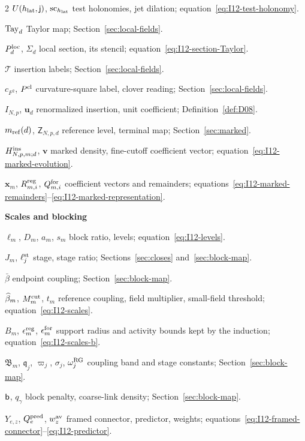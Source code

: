 \begin{multicols}{2}
$U(h_{\rm lat},\mathsf j)$, $\operatorname{sc}_{h_{\rm lat}}$ test holonomies, jet dilation; equation~\eqref{eq:I12-test-holonomy}.

$\operatorname{Tay}_d$ Taylor map; Section~\ref{sec:local-fields}.

$P_{d}^{\mathrm{loc}}$, $\Sigma_d$ local section, its stencil; equation~\eqref{eq:I12-section-Taylor}.

$\mathcal T$ insertion labels; Section~\ref{sec:local-fields}.

$c_{F^2}$, $P^{\rm cl}$ curvature-square label, clover reading; Section~\ref{sec:local-fields}.

$I_{N,p}$, $\mathbf u_d$ renormalized insertion, unit coefficient; Definition~\ref{def:D08}.

$m_{\mathrm{ref}}(d)$, $\mathsf Z_{N,p,d}$ reference level, terminal map; Section~\ref{sec:marked}.

$H^{\rm ins}_{N,p,m;d}$, $\mathbf v$ marked density, fine-cutoff coefficient vector; equation~\eqref{eq:I12-marked-evolution}.

$\mathbf x_m$, $R^{\rm reg}_{m,i}$, $Q^{\rm for}_{m,i}$ coefficient vectors and remainders; equations~\eqref{eq:I12-marked-remainders}--\eqref{eq:I12-marked-representation}.

\medskip\textbf{Scales and blocking}\par
$\ell_m$, $D_m$, $a_m$, $s_m$ block ratio, levels; equation~\eqref{eq:I12-levels}.

$J_m$, $\ell^{\rm st}_j$ stage, stage ratio; Sections~\ref{sec:closes} and~\ref{sec:block-map}.

$\bar\beta$ endpoint coupling; Section~\ref{sec:block-map}.

$\widehat{\beta}_m$, $M^{\mathrm{cut}}_m$, $t_m$ reference coupling, field multiplier, small-field threshold; equation~\eqref{eq:I12-scales}.

$B_m$, $\epsilon_m^{\rm reg}$, $\epsilon_m^{\rm for}$ support radius and activity bounds kept by the induction; equation~\eqref{eq:I12-scales-b}.

$\mathfrak B_m$, $\mathfrak q_j$, $\varpi_j$, $\sigma_j$, $\omega^{\rm RG}_j$ coupling band and stage constants; Section~\ref{sec:block-map}.

$\mathsf{b}$, $q_\gamma$ block penalty, coarse-link density; Section~\ref{sec:block-map}.

$Y_{e,z}$, $Q_e^{\rm pred}$, $w^{\rm av}_z$ framed connector, predictor, weights; equations~\eqref{eq:I12-framed-connector}--\eqref{eq:I12-predictor}.


\end{multicols}
